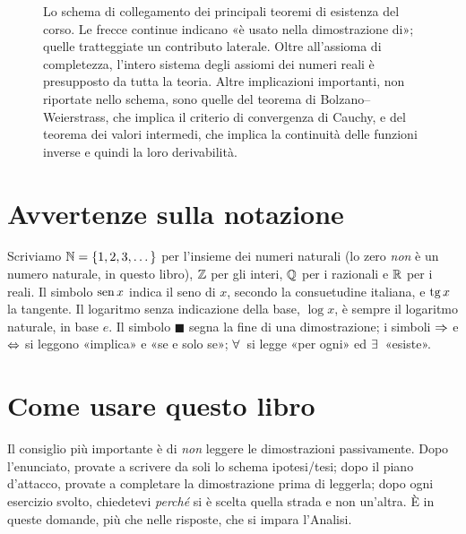 \begin{figure}[p]
\caption{Lo schema di collegamento dei principali teoremi di esistenza del corso. Le
frecce continue indicano «è usato nella dimostrazione di»; quelle tratteggiate un
contributo laterale. Oltre all'assioma di completezza, l'intero sistema degli assiomi dei
numeri reali è presupposto da tutta la teoria. Altre implicazioni importanti, non
riportate nello schema, sono quelle del teorema di Bolzano--Weierstrass, che implica il
criterio di convergenza di Cauchy, e del teorema dei valori intermedi, che implica la
continuità delle funzioni inverse e quindi la loro derivabilità.}
\label{fig:schema-teoremi}
\end{figure}

\section*{Avvertenze sulla notazione}

Scriviamo $\mathbb{N}=\{1,2,3,\dots\}$ per l'insieme dei numeri naturali (lo zero \emph{non} è
un numero naturale, in questo libro), $\mathbb{Z}$ per gli interi, $\mathbb{Q}$ per i razionali e
$\mathbb{R}$ per i reali. Il simbolo $\operatorname{sen} x$ indica il seno di $x$, secondo la consuetudine
italiana, e $\operatorname{tg} x$ la tangente. Il logaritmo senza indicazione della base, $\log x$, è
sempre il logaritmo naturale, in base $e$. Il simbolo $\blacksquare$ segna la fine di
una dimostrazione; i simboli $\Rightarrow$ e $\Leftrightarrow$ si leggono «implica» e «se e solo se»;
$\forall\,$ si legge «per ogni» ed $\exists\,$ «esiste».

\section*{Come usare questo libro}

Il consiglio più importante è di \emph{non} leggere le dimostrazioni passivamente.
Dopo l'enunciato, provate a scrivere da soli lo schema ipotesi/tesi; dopo il piano
d'attacco, provate a completare la dimostrazione prima di leggerla; dopo ogni esercizio
svolto, chiedetevi \emph{perché} si è scelta quella strada e non un'altra. È in queste
domande, più che nelle risposte, che si impara l'Analisi.

